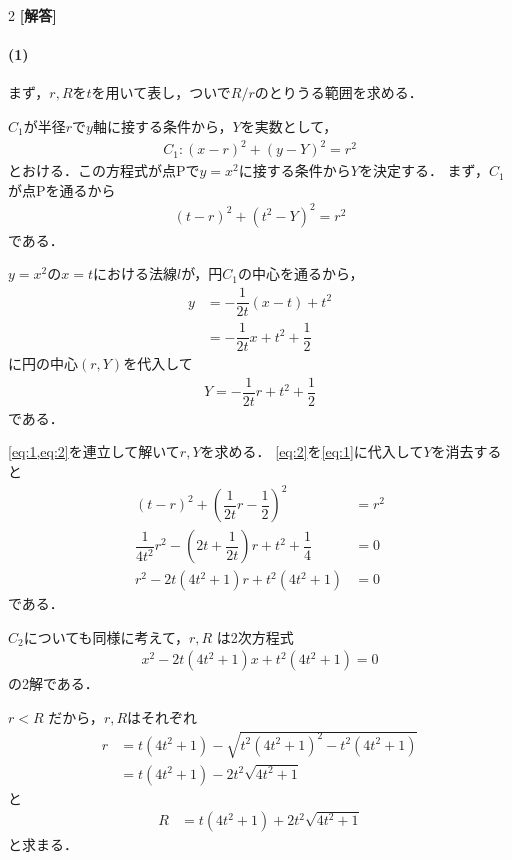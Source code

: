 \documentclass[../../main.tex]{subfiles}
\begin{document}
\setcounter{equation}{0}
\begin{oframed}
  
\end{oframed}
\setlength{\columnseprule}{0.4pt}
\begin{multicols}{2}
  {\bf [解答]}
  \paragraph{(1)}

  まず，$r,R$を$t$を用いて表し，ついで$R/r$のとりうる範囲を求める．

  $C_1$が半径$r$で$y$軸に接する条件から，$Y$を実数として，
  \begin{align}
    C_1: (x-r)^2 + (y-Y)^2 = r^2
  \end{align}
  とおける．この方程式が点Pで$y=x^2$に接する条件から$Y$を決定する．
  まず，$C_1$が点Pを通るから
  \begin{align}
    (t-r)^2 + (t^2-Y)^2 = r^2 \label{eq:1}
  \end{align}
  である．

  $y=x^2$の$x=t$における法線$l$が，円$C_1$の中心を通るから，
  \begin{align}
    y
    & = -\dfrac{1}{2t}(x-t) + t^2            \\
    & = -\dfrac{1}{2t}x + t^2 + \dfrac{1}{2}
  \end{align}
  に円の中心$(r,Y)$を代入して
  \begin{align}
    Y = -\dfrac{1}{2t}r + t^2 + \dfrac{1}{2}  \label{eq:2}
  \end{align}
  である．

  \cref{eq:1,eq:2}を連立して解いて$r,Y$を求める．
  \cref{eq:2}を\cref{eq:1}に代入して$Y$を消去すると
  \begin{align}
    (t-r)^2 + \left(\dfrac{1}{2t}r-\dfrac{1}{2}\right)^2                      & = r^2 \\
    \dfrac{1}{4t^2}r^2 - \left(2t + \dfrac{1}{2t}\right)r + t^2 + \dfrac{1}{4} & = 0   \\
    r^2 - 2t(4t^2+1)r + t^2(4t^2+1)                                         & = 0
  \end{align}
  である．

  $C_2$についても同様に考えて，$r, R$ は2次方程式
  \begin{align}
    x^2 - 2t(4t^2+1)x + t^2(4t^2+1) = 0
  \end{align}
  の2解である．

  $r < R$ だから，$r,R$はそれぞれ
  \begin{align}
    r & = t(4t^2+1) - \sqrt{t^2(4t^2+1)^2 - t^2(4t^2+1)}    \\
    & = t(4t^2+1) - 2t^2\sqrt{4t^2+1} \label{eq:3}
  \end{align}
  と
  \begin{align}
    R & = t(4t^2+1) + 2t^2\sqrt{4t^2+1} \label{eq:4}
  \end{align}
  と求まる．


\end{multicols}
\end{document}
